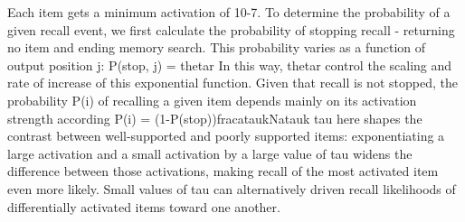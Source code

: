 {}Each item gets a minimum activation of \markdownRendererDollarSign{}10\markdownRendererCircumflex{}\markdownRendererLeftBrace{}-7\markdownRendererRightBrace{}\markdownRendererDollarSign{}. To determine the probability of a given recall event, we first calculate the probability of stopping recall - returning no item and ending memory search. This probability varies as a function of output position \markdownRendererDollarSign{}j\markdownRendererDollarSign{}:\markdownRendererInterblockSeparator
{}\markdownRendererDollarSign{}\markdownRendererDollarSign{}P(stop, j) = \markdownRendererBackslash{}thetar\markdownRendererRightBrace{}\markdownRendererDollarSign{}\markdownRendererDollarSign{}\markdownRendererInterblockSeparator
{}In this way, \markdownRendererDollarSign{}\markdownRendererBackslash{}thetar\markdownRendererDollarSign{} control the scaling and rate of increase of this exponential function. Given that recall is not stopped, the probability \markdownRendererDollarSign{}P(i\markdownRendererDollarSign{}) of recalling a given item depends mainly on its activation strength according\markdownRendererInterblockSeparator
{}\markdownRendererDollarSign{}\markdownRendererDollarSign{}P(i) = (1-P(stop))\markdownRendererBackslash{}frac\markdownRendererLeftBrace{}a\markdownRendererCircumflex{}\markdownRendererLeftBrace{}\markdownRendererBackslash{}tau\markdownRendererRightBrace{}\markdownRendererLeftBrace{}k\markdownRendererRightBrace{}\markdownRendererCircumflex{}\markdownRendererLeftBrace{}N\markdownRendererRightBrace{}a\markdownRendererCircumflex{}\markdownRendererLeftBrace{}\markdownRendererBackslash{}tau\markdownRendererRightBrace{}\markdownRendererUnderscore{}k\markdownRendererRightBrace{}\markdownRendererDollarSign{}\markdownRendererDollarSign{}\markdownRendererInterblockSeparator
{}\markdownRendererDollarSign{}\markdownRendererBackslash{}tau\markdownRendererDollarSign{} here shapes the contrast between well-supported and poorly supported items: exponentiating a large activation and a small activation by a large value of \markdownRendererDollarSign{}\markdownRendererBackslash{}tau\markdownRendererDollarSign{} widens the difference between those activations, making recall of the most activated item even more likely. Small values of \markdownRendererDollarSign{}\markdownRendererBackslash{}tau\markdownRendererDollarSign{} can alternatively driven recall likelihoods of differentially activated items toward one another.\markdownRendererInterblockSeparator
